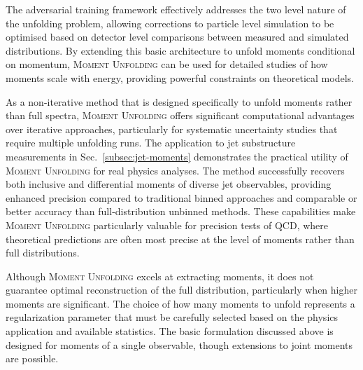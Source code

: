     The adversarial training framework effectively addresses the two level nature of the unfolding problem, allowing corrections to particle level simulation to be optimised based on detector level comparisons between measured and simulated distributions.
    By extending this basic architecture to unfold moments conditional on momentum, \textsc{Moment Unfolding} can be used for detailed studies of how moments scale with energy, providing powerful constraints on theoretical models.
    
    As a non-iterative method that is designed specifically to unfold moments rather than full spectra, \textsc{Moment Unfolding} offers significant computational advantages over iterative approaches, particularly for systematic uncertainty studies that require multiple unfolding runs.
    The application to jet substructure measurements in Sec.~\ref{subsec:jet-moments} demonstrates the practical utility of \textsc{Moment Unfolding} for real physics analyses.
    The method successfully recovers both inclusive and differential moments of diverse jet observables, providing enhanced precision compared to traditional binned approaches and comparable or better accuracy than full-distribution unbinned methods.
    These capabilities make \textsc{Moment Unfolding} particularly valuable for precision tests of QCD, where theoretical predictions are often most precise at the level of moments rather than full distributions.
    
    Although \textsc{Moment Unfolding} excels at extracting moments, it does not guarantee optimal reconstruction of the full distribution, particularly when higher moments are significant.
    The choice of how many moments to unfold represents a regularization parameter that must be carefully selected based on the physics application and available statistics.
    The basic formulation discussed above is designed for moments of a single observable, though extensions to joint moments are possible.
